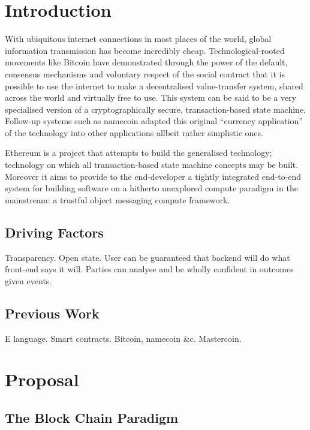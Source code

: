 \documentclass[9pt,oneside]{amsart}
\begin{document}
\setlength{\columnsep}{20pt}
\begin{multicols}{2}

\section{Introduction}\label{sec:introduction}

With ubiquitous internet connections in most places of the world, global information transmission has become incredibly cheap. Technological-rooted movements like Bitcoin have demonstrated through the power of the default, consensus mechanisms and voluntary respect of the social contract that it is possible to use the internet to make a decentralised value-transfer system, shared across the world and virtually free to use. This system can be said to be a very specialised version of a cryptographically secure, transaction-based state machine. Follow-up systems such as namecoin adapted this original ``currency application'' of the technology into other applications allbeit rather simplistic ones.

Ethereum is a project that attempts to build the generalised technology; technology on which all transaction-based state machine concepts may be built. Moreover it aims to provide to the end-developer a tightly integrated end-to-end system for building software on a hitherto unexplored compute paradigm in the mainstream: a trustful object messaging compute framework.

\subsection{Driving Factors} \label{ch:driving}

Transparency. Open state. User can be guaranteed that backend will do what front-end says it will. Parties can analyse and be wholly confident in outcomes given events.

\subsection{Previous Work} \label{ch:previous}

E language. Smart contracts. Bitcoin, namecoin \&c. Mastercoin.

\section{Proposal} \label{ch:proposal}

\subsection{The Block Chain Paradigm} \label{ch:overview}


\end{multicols}
\end{document}
